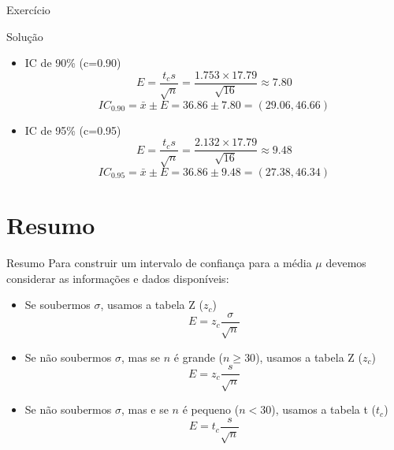 \documentclass{beamer}
\begin{document}
\begin{frame}{Exercício}
  \begin{block}{Solução}
    \begin{itemize}
    \item IC de 90\% (c=0.90)
    \begin{displaymath}
      E = \frac{t_c s}{\sqrt{n}} = \frac{1.753 \times 17.79}{\sqrt{16}}
      \approx 7.80
    \end{displaymath}
    \begin{displaymath}
      IC_{0.90} = \bar{x} \pm E = 36.86 \pm 7.80 = (29.06 , 46.66)
    \end{displaymath}
  \item IC de 95\% (c=0.95)
    \begin{displaymath}
      E = \frac{t_c s}{\sqrt{n}} = \frac{2.132 \times 17.79}{\sqrt{16}}
      \approx 9.48
    \end{displaymath}
    \begin{displaymath}
      IC_{0.95} = \bar{x} \pm E = 36.86 \pm 9.48 = (27.38 , 46.34)
    \end{displaymath}
  \end{itemize}
\end{block}
\end{frame}


\section{Resumo}

\begin{frame}{Resumo}
  Para construir um intervalo de confiança para a média $\mu$ devemos
  considerar as informações e dados disponíveis:
  \begin{itemize}
  \item Se soubermos $\sigma$, usamos a tabela Z
    ($z_c$)
    \begin{displaymath}
      E = z_c \frac{\sigma}{\sqrt{n}}
    \end{displaymath}
  \item Se não soubermos $\sigma$, mas se $n$ é grande ($n \ge 30$),
    usamos a tabela Z ($z_c$)
    \begin{displaymath}
      E = z_c \frac{s}{\sqrt{n}}
    \end{displaymath}
  \item Se não soubermos $\sigma$, mas e se $n$ é pequeno ($n < 30$),
    usamos a tabela t ($t_c$)
    \begin{displaymath}
      E = t_c \frac{s}{\sqrt{n}}
    \end{displaymath}
  \end{itemize}
\end{frame}
\end{document}
